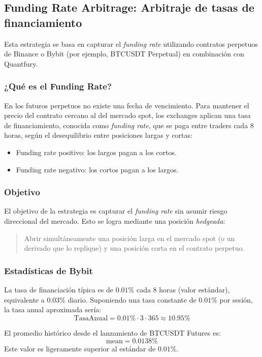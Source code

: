 \documentclass[../main.tex]{subfiles}
\begin{document}
\subsection{Funding Rate Arbitrage: Arbitraje de tasas de financiamiento}
Esta estrategia se basa en capturar el \emph{funding rate} utilizando contratos perpetuos de Binance o Bybit (por ejemplo, BTCUSDT Perpetual) en combinación con Quantfury.

\subsubsection{¿Qué es el Funding Rate?}
En los futuros perpetuos no existe una fecha de vencimiento. Para mantener el precio del contrato cercano al del mercado spot, los exchanges aplican una tasa de financiamiento, conocida como \emph{funding rate}, que se paga entre traders cada 8 horas, según el desequilibrio entre posiciones largas y cortas:

\begin{itemize}
    \item Funding rate positivo: los largos pagan a los cortos.
    \item Funding rate negativo: los cortos pagan a los largos.
\end{itemize}

\subsubsection{Objetivo}
El objetivo de la estrategia es capturar el \emph{funding rate} sin asumir riesgo direccional del mercado. Esto se logra mediante una posición \emph{hedgeada}:

\begin{quote}
Abrir simultáneamente una posición larga en el mercado spot (o un derivado que lo replique) y una posición corta en el contrato perpetuo.
\end{quote}

\subsubsection{Estadísticas de Bybit}
La tasa de financiación típica es de $0.01\%$ cada 8 horas (valor estándar), equivalente a $0.03\%$ diario.  
Suponiendo una tasa constante de $0.01\%$ por sesión, la tasa anual aproximada sería:
\[
\text{TasaAnual} = 0.01\% \cdot 3 \cdot 365 \approx 10.95\%
\]

El promedio histórico desde el lanzamiento de BTCUSDT Futures es:
\[
\text{mean} = 0.0138\%
\]
Este valor es ligeramente superior al estándar de $0.01\%$.
\end{document}
